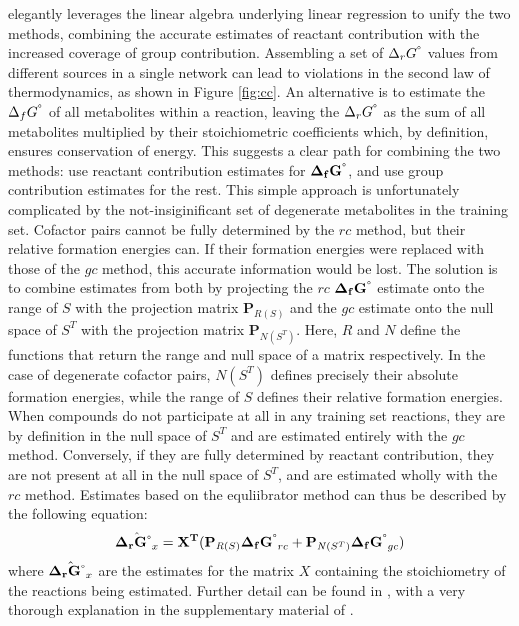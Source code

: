 \documentclass[10pt,letterpaper]{article}
\newcommand{\sdgf}{\Delta_fG^{\degree}}
\newcommand{\sdgr}{\Delta_rG^{\degree}}
\newcommand{\bsdgf}{\mathbf{\sdgf}}
\newcommand{\bsdgr}{\mathbf{\sdgr}}
\newcommand{\projr}{\mathbf{P}_{\mathit{R}(S)}}
\newcommand{\projn}{\mathbf{P}_{\mathit{N}(S^T)}}
\begin{document}
\cite{noor_2013_equilibrator} elegantly leverages the linear algebra underlying linear regression to unify the two methods, combining the accurate estimates of reactant contribution with the increased coverage of group contribution.
Assembling a set of $\sdgr$ values from different sources in a single network can lead to violations in the second law of thermodynamics, as shown in Figure \ref{fig:cc}.
An alternative is to estimate the $\sdgf$ of all metabolites within a reaction, leaving the $\sdgr$ as the sum of all metabolites multiplied by their stoichiometric coefficients which, by definition, ensures conservation of energy. %
This suggests a clear path for combining the two methods: use reactant contribution estimates for $\bsdgf$, and use group contribution estimates for the rest.
This simple approach is unfortunately complicated by the not-insiginificant set of degenerate metabolites in the training set. %
Cofactor pairs cannot be fully determined by the $rc$ method, but their relative formation energies can.
If their formation energies were replaced with those of the $gc$ method, this accurate information would be lost.
The solution is to combine estimates from both by projecting the $rc$ $\bsdgf$ estimate onto the range of $S$ with the projection matrix $\projr$ and the $gc$ estimate onto the null space of $S^T$ with the projection matrix $\projn$.
Here, $\mathit{R}$ and $\mathit{N}$ define the functions that return the range and null space of a matrix respectively.
In the case of degenerate cofactor pairs, $\mathit{N}(S^T)$ defines precisely their absolute formation energies, while the range of $S$ defines their relative formation energies.
When compounds do not participate at all in any training set reactions, they are by definition in the null space of $S^T$ and are estimated entirely with the $gc$ method.
Conversely, if they are fully determined by reactant contribution, they are not present at all in the null space of $S^T$, and are estimated wholly with the $rc$ method.
Estimates based on the equliibrator method can thus be described by the following equation:
\[
    \hat{\bsdgr_x} = \mathbf{X^T}(\projr\bsdgf_{rc} + \projn\bsdgf_{gc})\\
\]
where $\hat{\bsdgr_x}$ are the estimates for the matrix $X$ containing the stoichiometry of the reactions being estimated. %
Further detail can be found in \cite{noor_2013_equilibrator}, with a very thorough explanation in the supplementary material of \cite{equilibrator_3_beber_noor}.
\end{document}
